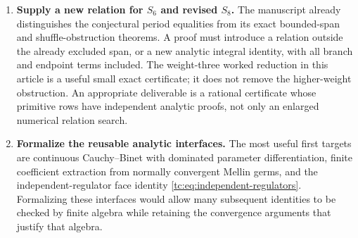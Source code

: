 \documentclass[11pt,a4paper]{article}
\numberwithin{equation}{section}
\theoremstyle{definition}
\theoremstyle{remark}
\begin{document}
\begin{enumerate}[label=\textbf{Q\arabic*.},leftmargin=*]
\item \textbf{Supply a new relation for $S_6$ and revised $S_8$.}
The manuscript already distinguishes the conjectural period
equalities from its exact bounded-span and shuffle-obstruction
theorems. A proof must introduce a relation outside the
already excluded span, or a new analytic integral identity,
with all branch and endpoint terms included. The weight-three
worked reduction in this article is a useful small exact
certificate; it does not remove the higher-weight obstruction.
An appropriate deliverable is a rational certificate whose
primitive rows have independent analytic proofs, not only an
enlarged numerical relation search.

\item \textbf{Formalize the reusable analytic interfaces.}
The most useful first targets are continuous Cauchy--Binet with
dominated parameter differentiation, finite coefficient
extraction from normally convergent Mellin germs, and the
independent-regulator face identity
\eqref{tc:eq:independent-regulators}. Formalizing these
interfaces would allow many subsequent identities to be
checked by finite algebra while retaining the convergence
arguments that justify that algebra.

\end{enumerate}


\end{document}
